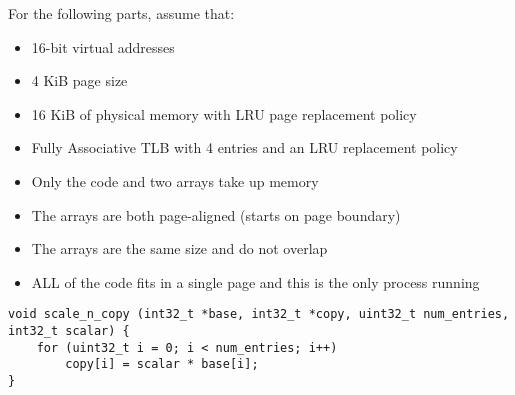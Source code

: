 \begin{blocksection}
\question For the following parts, assume that:
\begin{itemize}
\item 16-bit virtual addresses
\item 4 KiB page size
\item 16 KiB of physical memory with LRU page replacement policy
\item Fully Associative TLB with 4 entries and an LRU replacement policy
\item Only the code and two arrays take up memory
\item The arrays are both page-aligned (starts on page boundary)
\item The arrays are the same size and do not overlap
\item ALL of the code fits in a single page and this is the only process running
\end{itemize}

\begin{verbatim}
void scale_n_copy (int32_t *base, int32_t *copy, uint32_t num_entries, int32_t scalar) {
    for (uint32_t i = 0; i < num_entries; i++)
        copy[i] = scalar * base[i];
}   
\end{verbatim}

\end{blocksection}
